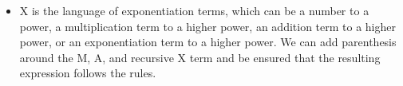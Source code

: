 \documentclass[11pt, letterpaper]{article}
\begin{document}
\begin{enumerate}[label=\Alph*]
\begin{itemize}
\item X is the language of exponentiation terms, which can be a number to a power, a multiplication term to a higher power, an addition term to a higher power, or an exponentiation term to a higher power. We can add parenthesis around the M, A, and recursive X term and be ensured that the resulting expression follows the rules.

\end{itemize} 

\end{enumerate}
\end{document}
